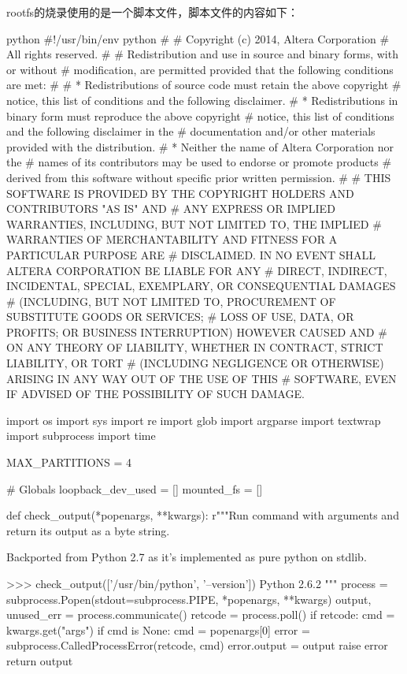 rootfs的烧录使用的是一个脚本文件，脚本文件的内容如下：
\begin{code-block}{python}
#!/usr/bin/env python
#
# Copyright (c) 2014, Altera Corporation
# All rights reserved.
#
# Redistribution and use in source and binary forms, with or without
# modification, are permitted provided that the following conditions are met:
#
#     * Redistributions of source code must retain the above copyright
#       notice, this list of conditions and the following disclaimer.
#     * Redistributions in binary form must reproduce the above copyright
#       notice, this list of conditions and the following disclaimer in the
#       documentation and/or other materials provided with the distribution.
#     * Neither the name of Altera Corporation nor the
#       names of its contributors may be used to endorse or promote products
#       derived from this software without specific prior written permission.
#
# THIS SOFTWARE IS PROVIDED BY THE COPYRIGHT HOLDERS AND CONTRIBUTORS "AS IS" AND
# ANY EXPRESS OR IMPLIED WARRANTIES, INCLUDING, BUT NOT LIMITED TO, THE IMPLIED
# WARRANTIES OF MERCHANTABILITY AND FITNESS FOR A PARTICULAR PURPOSE ARE
# DISCLAIMED.  IN NO EVENT SHALL ALTERA CORPORATION BE LIABLE FOR ANY
# DIRECT, INDIRECT, INCIDENTAL, SPECIAL, EXEMPLARY, OR CONSEQUENTIAL DAMAGES
# (INCLUDING, BUT NOT LIMITED TO, PROCUREMENT OF SUBSTITUTE GOODS OR SERVICES;
# LOSS OF USE, DATA, OR PROFITS; OR BUSINESS INTERRUPTION) HOWEVER CAUSED AND
# ON ANY THEORY OF LIABILITY, WHETHER IN CONTRACT, STRICT LIABILITY, OR TORT
# (INCLUDING NEGLIGENCE OR OTHERWISE) ARISING IN ANY WAY OUT OF THE USE OF THIS
# SOFTWARE, EVEN IF ADVISED OF THE POSSIBILITY OF SUCH DAMAGE.

import os
import sys
import re
import glob
import argparse
import textwrap
import subprocess
import time

MAX_PARTITIONS = 4

# Globals
loopback_dev_used = []
mounted_fs = []

def check_output(*popenargs, **kwargs):
    r"""Run command with arguments and return its output as a byte string.

    Backported from Python 2.7 as it's implemented as pure python on stdlib.

    >>> check_output(['/usr/bin/python', '--version'])
    Python 2.6.2
    """
    process = subprocess.Popen(stdout=subprocess.PIPE, *popenargs, **kwargs)
    output, unused_err = process.communicate()
    retcode = process.poll()
    if retcode:
        cmd = kwargs.get("args")
        if cmd is None:
            cmd = popenargs[0]
            error = subprocess.CalledProcessError(retcode, cmd)
            error.output = output
        raise error
    return output


\end{code-block}
